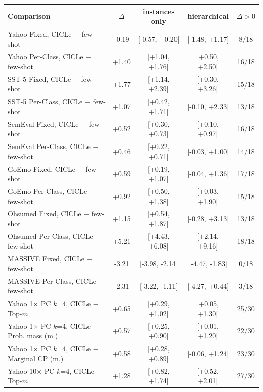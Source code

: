 \begin{tabular}{lcccc}
\toprule
Comparison & $\Delta$ & instances only & hierarchical & $\Delta>0$ \\
\midrule
Yahoo Fixed, CICLe $-$ few-shot & -0.19 & [-0.57, +0.20] & [-1.48, +1.17] & 8/18 \\
Yahoo Per-Class, CICLe $-$ few-shot & +1.40 & [+1.04, +1.76] & [+0.50, +2.50] & 16/18 \\
SST-5 Fixed, CICLe $-$ few-shot & +1.77 & [+1.14, +2.39] & [+0.30, +3.26] & 15/18 \\
SST-5 Per-Class, CICLe $-$ few-shot & +1.07 & [+0.42, +1.71] & [-0.10, +2.33] & 13/18 \\
SemEval Fixed, CICLe $-$ few-shot & +0.52 & [+0.30, +0.73] & [+0.10, +0.97] & 16/18 \\
SemEval Per-Class, CICLe $-$ few-shot & +0.46 & [+0.22, +0.71] & [-0.03, +1.00] & 14/18 \\
GoEmo Fixed, CICLe $-$ few-shot & +0.59 & [+0.19, +1.07] & [-0.04, +1.36] & 17/18 \\
GoEmo Per-Class, CICLe $-$ few-shot & +0.92 & [+0.50, +1.38] & [+0.03, +1.90] & 15/18 \\
Ohsumed Fixed, CICLe $-$ few-shot & +1.15 & [+0.54, +1.87] & [-0.28, +3.13] & 13/18 \\
Ohsumed Per-Class, CICLe $-$ few-shot & +5.21 & [+4.43, +6.08] & [+2.14, +9.16] & 18/18 \\
MASSIVE Fixed, CICLe $-$ few-shot & -3.21 & [-3.98, -2.14] & [-4.47, -1.83] & 0/18 \\
MASSIVE Per-Class, CICLe $-$ few-shot & -2.31 & [-3.22, -1.11] & [-4.27, +0.44] & 3/18 \\
\midrule
Yahoo 1$\times$ PC $k$=4, CICLe $-$ Top-$m$ & +0.65 & [+0.29, +1.02] & [+0.05, +1.30] & 25/30 \\
Yahoo 1$\times$ PC $k$=4, CICLe $-$ Prob. mass (m.) & +0.57 & [+0.25, +0.90] & [+0.01, +1.20] & 22/30 \\
Yahoo 1$\times$ PC $k$=4, CICLe $-$ Marginal CP (m.) & +0.58 & [+0.28, +0.89] & [-0.06, +1.24] & 23/30 \\
Yahoo 10$\times$ PC $k$=4, CICLe $-$ Top-$m$ & +1.28 & [+0.82, +1.74] & [+0.52, +2.01] & 27/30 \\

\end{tabular}
